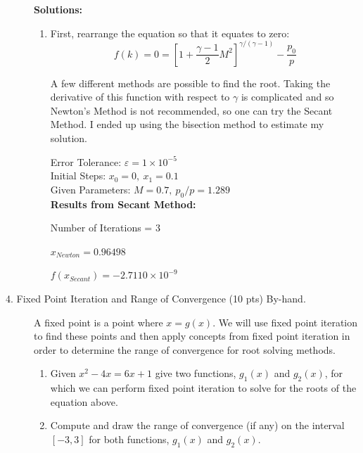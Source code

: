 \documentclass[12pt]{article}
\begin{document}
\begin{description}
\ifsolution
\color{red}
\textbf{Solutions:}
\begin{enumerate} [label=(\alph*)]
	\item 	
	First, rearrange the equation so that it equates to zero:
	\begin{equation*}
	f(k) = 0 = \left[ 1 + \frac{\gamma-1}{2}M^2 \right]^{\gamma/(\gamma-1)} - \frac{p_0}{p}
	\end{equation*}
	
	A few different methods are possible to find the root. Taking the derivative of this function with respect to $\gamma$ is complicated and so Newton's Method is not recommended, so one can try the Secant Method. I ended up using the bisection method to estimate my solution.
	
	
	Error Tolerance: $\varepsilon = 1 \times 10^{-5}$ \\
	Initial Steps: $x_{0} = 0, \ x_{1} = 0.1$ \\
	Given Parameters: $M = 0.7, \ p_0/p = 1.289$ \\
	
	\textbf{Results from Secant Method:}
	
	Number of Iterations = 3
	
	$x_{Newton} = 0.96498$
	
	$f(x_{Secant}) = -2.7110 \times 10^{-9}$
\end{enumerate}
\color{black}
\fi

\item[4. Fixed Point Iteration and Range of Convergence (10 pts) By-hand.] A fixed point is a point where $x = g (x)$. We will use fixed point iteration to find these points and then apply concepts from fixed point iteration in order to determine the range of convergence for root solving methods.
\begin{enumerate} [label=(\alph*)]
	\item Given $x^2 -4x = 6x + 1$ give two functions, $g_1 (x)$ and $g_2 (x)$, for which we can perform fixed point iteration to solve for the roots of the equation above.
	\item Compute and draw the range of convergence (if any) on the interval $[-3,3]$ for both functions, $g_1 (x)$ and $g_2 (x)$.
\end{enumerate}
	

\end{description}
\end{document}
